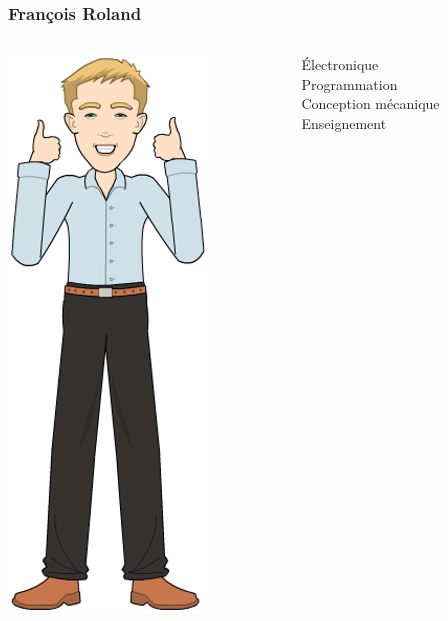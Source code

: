 \documentclass[aspectratio=169,utf8]{beamer}
\begin{document}
\begin{frame}
  \frametitle{François Roland}
  \begin{columns}
    \begin{column}{.3\textwidth}
      \begin{center}
        \includegraphics[height=.7\textheight]{francois2.png}
      \end{center}
    \end{column}
    \begin{column}{.7\textwidth}
      Électronique \\
      Programmation \\
      Conception mécanique \\
      Enseignement
    \end{column}
  \end{columns}
\end{frame}
\end{document}
